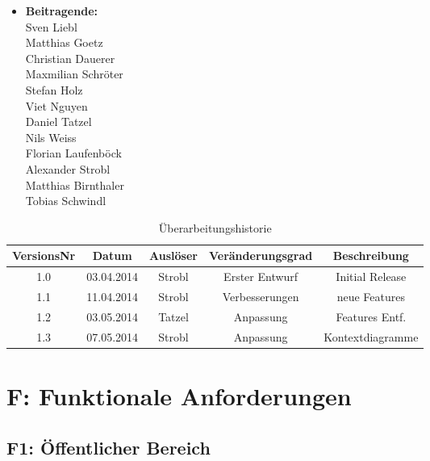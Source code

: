 \documentclass[10pt,a4paper]{scrartcl}
\begin{document}
\newcommand{\Version}{1.2}






\newpage
\begin{itemize}
\item[] \textbf{\large Beitragende:}\\
Sven Liebl\\
Matthias Goetz\\
Christian Dauerer\\
Maxmilian Schröter\\
Stefan Holz\\
Viet Nguyen\\
Daniel Tatzel\\
Nils Weiss\\
Florian Laufenböck\\
Alexander Strobl\\
Matthias Birnthaler\\
Tobias Schwindl
\end{itemize}

\bigskip

\begin{table}[!h]
 	\centering
	\begin{tabular}{|c|c|c|c||c|} 
	\hline
	\textbf{VersionsNr} &  \textbf{Datum} & \textbf{Auslöser} & \textbf{Veränderungsgrad} & \textbf{Beschreibung} \\
	\hline
	1.0 & 03.04.2014 & Strobl & Erster Entwurf & Initial Release \\
	\hline
	1.1 & 11.04.2014 & Strobl & Verbesserungen & neue Features \\
	\hline
	1.2 & 03.05.2014 & Tatzel & Anpassung & Features Entf. \\
	\hline
	1.3 & 07.05.2014 & Strobl & Anpassung & Kontextdiagramme \\
	\hline
	\end{tabular}

\caption{Überarbeitungshistorie}
\end{table}

\newpage
\tableofcontents


\newpage
\section{F: Funktionale Anforderungen}


\subsection{F1: Öffentlicher Bereich}
\end{document}
